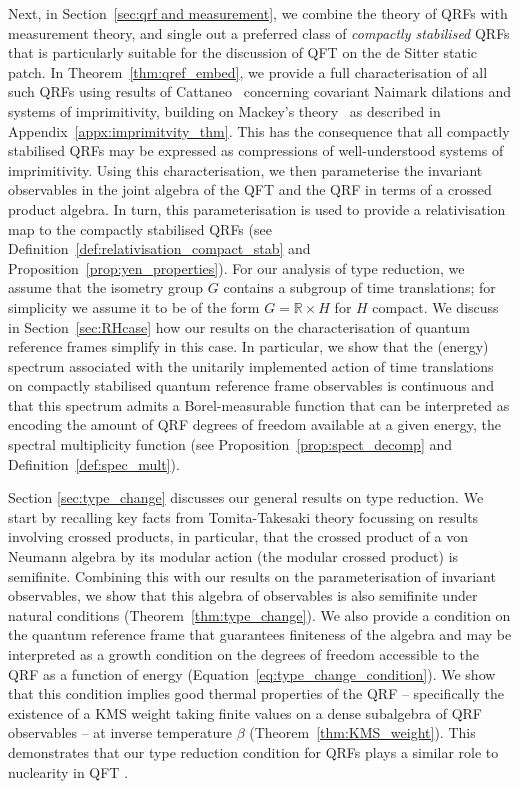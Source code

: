 \documentclass[sn-mathphys-num]{sn-jnl}%
\newcommand{\RR}{\mathbb{R}}
\numberwithin{equation}{section}
\theoremstyle{thmstyleone}%
\theoremstyle{thmstyletwo}%
\theoremstyle{thmstylethree}%
\begin{document}
Next, in Section~\ref{sec:qrf and measurement}, we combine the theory of QRFs with measurement theory, and single out a preferred class of \emph{compactly stabilised} QRFs that is particularly suitable for the discussion of QFT on the de Sitter static patch. In Theorem~\ref{thm:qref_embed}, we provide a full characterisation of all such QRFs using results of Cattaneo~\cite{Cattaneo:1979}
concerning covariant Naimark dilations and systems of imprimitivity, building on Mackey's theory~\cite{mackey1949imprimitivity,mackey1952induced} as described in Appendix~\ref{appx:imprimitvity_thm}. This has the consequence that all compactly stabilised QRFs may be expressed as compressions of well-understood systems of imprimitivity. Using this characterisation, we then parameterise the invariant observables in the joint algebra of the QFT and the QRF in terms of a crossed product algebra. In turn, this parameterisation is used to provide a relativisation map to the compactly stabilised QRFs (see Definition~\ref{def:relativisation_compact_stab} and Proposition~\ref{prop:yen_properties}). For our analysis of type reduction, we assume that the isometry group $G$ contains a subgroup of time translations; for simplicity we assume it to be of the form $G=\RR\times H$ for $H$ compact. We discuss in Section~\ref{sec:RHcase} how our results on the characterisation of quantum reference frames simplify in this case. In particular, we show that the (energy) spectrum associated with the unitarily implemented action of time translations on compactly stabilised quantum reference frame observables is continuous and that this spectrum admits a Borel-measurable function that can be interpreted as encoding the amount of QRF degrees of freedom available at a given energy, the spectral multiplicity function (see Proposition~\ref{prop:spect_decomp} and Definition~\ref{def:spec_mult}).

Section \ref{sec:type_change} discusses our general results on type reduction. We start by recalling key facts from Tomita-Takesaki theory focussing on results involving crossed products, in particular, that the crossed product of a von Neumann algebra by its modular action (the modular crossed product) is semifinite. Combining this with our results on the parameterisation of invariant observables, we show that this algebra of observables is also semifinite under natural conditions (Theorem~\ref{thm:type_change}). We also provide a condition on the quantum reference frame that guarantees finiteness of the algebra and may be interpreted as a growth condition on the degrees of freedom accessible to the QRF as a function of energy (Equation~\eqref{eq:type_change_condition}). We show that this condition implies good thermal properties of the QRF -- specifically the existence of a KMS weight taking finite values on a dense subalgebra of QRF observables -- at inverse temperature $\beta$ (Theorem~\ref{thm:KMS_weight}). This demonstrates that our type reduction condition for QRFs plays a similar role to nuclearity in QFT \cite{Buchholz:1988fk}.
\end{document}
